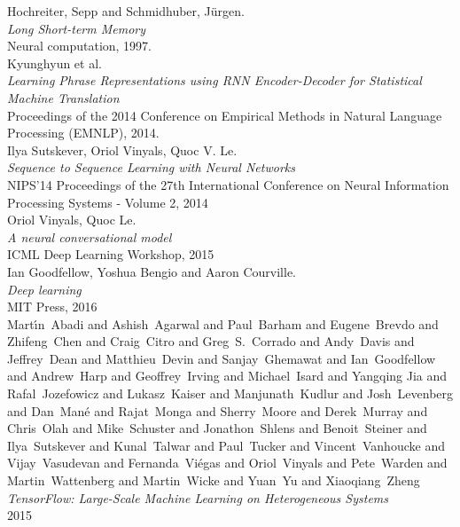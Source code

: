 \documentclass{llncs}
\begin{document}
\begin{thebibliography}{9}

Hochreiter, Sepp and Schmidhuber, Jürgen.\\
\textit{Long Short-term Memory}\\
Neural computation, 1997.\\

Kyunghyun et al.\\
\textit{Learning Phrase Representations using RNN Encoder-Decoder for Statistical Machine Translation}\\
Proceedings of the 2014 Conference on Empirical Methods in Natural Language Processing (EMNLP), 2014.\\

Ilya Sutskever, Oriol Vinyals, Quoc V. Le.\\
\textit{ Sequence to Sequence Learning with Neural Networks}\\
NIPS'14 Proceedings of the 27th International Conference on Neural Information Processing Systems - Volume 2, 2014 \\

Oriol Vinyals, Quoc Le.\\
\textit{A neural conversational model}\\
ICML Deep Learning Workshop, 2015 \\

Ian Goodfellow, Yoshua Bengio and Aaron Courville.\\
\textit{Deep learning}\\
MIT Press, 2016 \\

Mart\'{\i}n~Abadi and
    Ashish~Agarwal and
    Paul~Barham and
    Eugene~Brevdo and
    Zhifeng~Chen and
    Craig~Citro and
    Greg~S.~Corrado and
    Andy~Davis and
    Jeffrey~Dean and
    Matthieu~Devin and
    Sanjay~Ghemawat and
    Ian~Goodfellow and
    Andrew~Harp and
    Geoffrey~Irving and
    Michael~Isard and
    Yangqing Jia and
    Rafal~Jozefowicz and
    Lukasz~Kaiser and
    Manjunath~Kudlur and
    Josh~Levenberg and
    Dan~Man\'{e} and
    Rajat~Monga and
    Sherry~Moore and
    Derek~Murray and
    Chris~Olah and
    Mike~Schuster and
    Jonathon~Shlens and
    Benoit~Steiner and
    Ilya~Sutskever and
    Kunal~Talwar and
    Paul~Tucker and
    Vincent~Vanhoucke and
    Vijay~Vasudevan and
    Fernanda~Vi\'{e}gas and
    Oriol~Vinyals and
    Pete~Warden and
    Martin~Wattenberg and
    Martin~Wicke and
    Yuan~Yu and
    Xiaoqiang~Zheng\\
\textit{ TensorFlow: Large-Scale Machine Learning on Heterogeneous Systems }\\
2015 \\

\end{thebibliography}
\end{document}
